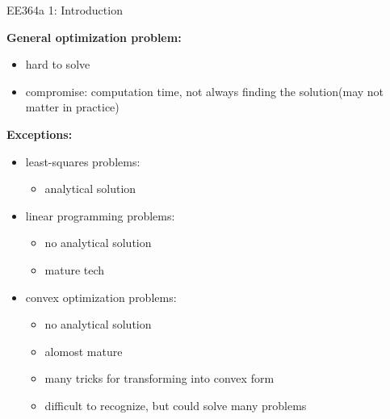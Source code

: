 \documentclass{article}
\begin{document}
\begin{center}
    EE364a 1: Introduction    
\end{center}
\textbf{General optimization problem:} \newline

\begin{itemize}
    \item hard to solve \newline
    \item compromise: computation time, not always finding the solution(may not matter in practice) \newline
\end{itemize}


\textbf{Exceptions:} \newline
\begin{itemize}
    \item least-squares problems: 
    \begin{itemize}
        \item analytical solution
    \end{itemize}

    \item linear programming problems:
    \begin{itemize}
        \item no analytical solution 
        \item mature tech 
    \end{itemize}
    
    \item convex optimization problems:
    \begin{itemize}
        \item no analytical solution   
        \item alomost mature 
        \item many tricks for transforming into convex form 
        \item difficult to recognize, but could solve many problems 
    \end{itemize}
\end{itemize}
    
        

        
\end{document}

